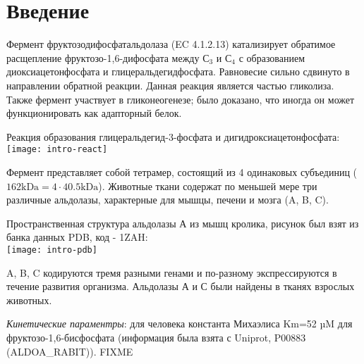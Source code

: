 \section{Введение}
Фермент фруктозодифосфатальдолаза (EC 4.1.2.13) катализирует обратимое расщепление
фруктозо-1,6-дифосфата между $С_3$ и $С_4$ с образованием диоксиацетонфосфата и глицеральдегидфосфата.
Равновесие сильно сдвинуто в направлении обратной реакции.
Данная реакция является частью гликолиза. Также фермент участвует в гликонеогенезе;
было доказано, что иногда он может функционировать как адапторный белок.

Реакция образования глицеральдегид-3-фосфата и дигидроксиацетонфосфата:\\
\texttt{[image: intro-react]}

Фермент представляет собой тетрамер, состоящий из 4 одинаковых субъединиц
($ 162 \text{kDa} = 4 \cdot 40.5 \text{kDa} $).
Животные ткани содержат по меньшей мере три различные альдолазы, характерные для
мышцы, печени и мозга (A, B, C).

Пространственная структура альдолазы А из мышц кролика, рисунок был взят из банка данных PDB, код - 1ZAH:\\
\texttt{[image: intro-pdb]}

A, B, C кодируются тремя разными генами и по-разному экспрессируются в течение развития организма.
Альдолазы А и С были найдены в тканях взрослых животных.

\emph{Кинетические параментры}: для человека константа Михаэлиса Km=52 µM для фруктозо-1,6-бисфосфата
(информация была взята с Uniprot, P00883 (ALDOA\_RABIT)). FIXME

